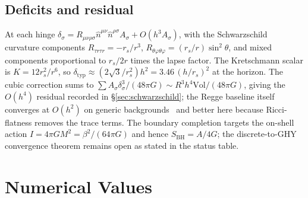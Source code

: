 \documentclass[11pt,letterpaper]{article}
\theoremstyle{definition}
\newcommand{\BH}{\mathrm{BH}}
\newcommand{\Vol}{\mathrm{Vol}}
\begin{document}
\subsection{Deficits and residual}
At each hinge $\delta_\sigma=R_{\mu\nu\rho\sigma}
\hat n^{\mu\nu}\hat n^{\rho\sigma}A_\sigma+O(h^3A_\sigma)$, with the
Schwarzschild curvature components
$R_{\tau r\tau r}=-r_s/r^3$,
$R_{\theta\varphi\theta\varphi}=(r_s/r)\sin^2\theta$, and mixed
components proportional to $r_s/2r$ times the lapse factor.  The
Kretschmann scalar is $K=12r_s^2/r^6$, so
$\delta_{\mathrm{typ}}\approx(2\sqrt3/r_s^2)h^2=3.46\,(h/r_s)^2$ at
the horizon.  The cubic correction sums to
$\sum A_\sigma\delta_\sigma^3/(48\pi G)\sim R^3h^4\Vol/(48\pi G)$,
giving the $O(h^4)$ residual recorded in \S\ref{sec:schwarzschild};
the Regge baseline itself converges at $O(h^2)$ on generic
backgrounds~\cite{CheegerMullerSchrader1984} and better here because
Ricci-flatness removes the trace terms.  The boundary completion
targets the on-shell action $I=4\pi GM^2=\beta^2/(64\pi G)$ and hence
$S_\BH=A/4G$; the discrete-to-GHY convergence theorem remains open as
stated in the status table.

\section{Numerical Values}
\label{app:values}
\end{document}
